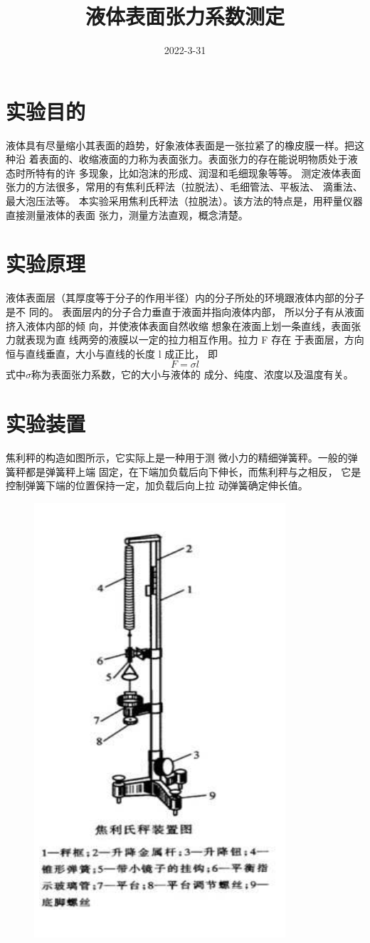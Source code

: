 \documentclass[12pt]{ustcreport}
\date{2022-3-31}			%
\title{液体表面张力系数测定}
\begin{document}
\section{实验目的}
液体具有尽量缩小其表面的趋势，好象液体表面是一张拉紧了的橡皮膜一样。把这种沿
着表面的、收缩液面的力称为表面张力。表面张力的存在能说明物质处于液态时所特有的许
多现象，比如泡沫的形成、润湿和毛细现象等等。
测定液体表面张力的方法很多，常用的有焦利氏秤法（拉脱法）、毛细管法、平板法、
滴重法、最大泡压法等。
本实验采用焦利氏秤法（拉脱法）。该方法的特点是，用秤量仪器直接测量液体的表面
张力，测量方法直观，概念清楚。
\section{实验原理}
液体表面层（其厚度等于分子的作用半径）内的分子所处的环境跟液体内部的分子是不
同的。
表面层内的分子合力垂直于液面并指向液体内部， 所以分子有从液面挤入液体内部的倾
向，并使液体表面自然收缩
想象在液面上划一条直线，表面张力就表现为直
线两旁的液膜以一定的拉力相互作用。拉力 F 存在
于表面层，方向恒与直线垂直，大小与直线的长度
l 成正比，
即
\begin{equation*}
    F = \sigma l
\end{equation*}
式中$\sigma $称为表面张力系数，它的大小与液体的
成分、纯度、浓度以及温度有关。
\section{实验装置}
焦利秤的构造如图所示，它实际上是一种用于测
微小力的精细弹簧秤。一般的弹簧秤都是弹簧秤上端
固定，在下端加负载后向下伸长，而焦利秤与之相反，
它是控制弹簧下端的位置保持一定，加负载后向上拉
动弹簧确定伸长值。
\begin{figure}[H]
    \centering
    \includegraphics[width = 0.3\linewidth]{BMZLSYZZ.png}
    \label{mylabel1}
\end{figure}
\end{document}
